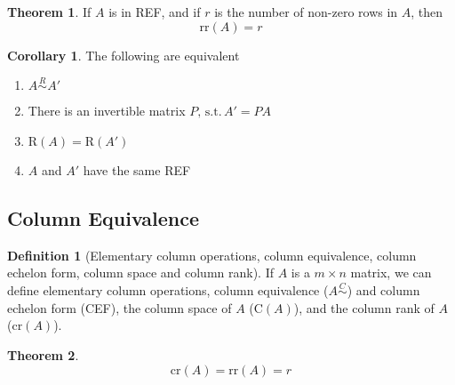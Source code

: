 \documentclass[fleqn, a4paper, 12pt]{article}
\theoremstyle{definition}
\newtheorem{definition}{Definition} %
\theoremstyle{theorem}
\newtheorem{theorem}{Theorem} %
\newtheorem{corollary}{Corollary}
\theoremstyle{remark}
\newcommand{\suchthat}{\mathrm{\,s.t.\,}}
\newcommand{\R}{\mathrm{R}}
\newcommand{\C}{\mathrm{C}}
\newcommand{\rr}{\mathrm{rr}}
\numberwithin{corollary}{theorem}
\numberwithin{equation}{theorem}
\begin{document}
\begin{theorem}
	If $A$ is in REF, and if $r$ is the number of non-zero rows in $A$, then
	\begin{equation*}
	\rr(A) = r
	\end{equation*}
\end{theorem}

\begin{corollary}
	The following are equivalent
	\begin{enumerate}
		\item $A \stackrel{R}{\sim} A'$
		\item There is an invertible matrix $P, \suchthat A' = P A$
		\item $\R(A) = \R(A')$
		\item $A$ and $A'$ have the same REF
	\end{enumerate}
\end{corollary}

\subsection{Column Equivalence}

\begin{definition}[Elementary column operations, column equivalence, column echelon form, column space and column rank]
	If $A$ is a $m \times n$ matrix, we can define elementary column operations, column equivalence ($A \stackrel{C}{\sim}$) and column echelon form (CEF), the column space of $A$ ($\C(A)$), and the column rank of $A$ ($\mathrm{cr}(A)$).
\end{definition}

\begin{theorem}
	\begin{equation*}
	\mathrm{cr}(A) = \rr(A) =  r
	\end{equation*}
\end{theorem}
\end{document}
